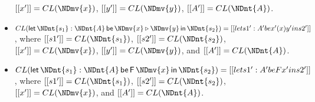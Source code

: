 \begin{definition}
\begin{itemize}
        $[[x']] = CL(\NDmv{x})$, $[[y']] = CL(\NDmv{y})$, $[[A']] = CL(\NDnt{A})$.
  \item $CL( \mathsf{let}\, \NDnt{s_{{\mathrm{1}}}}  :  \NDnt{A} \,\mathsf{be}\, \NDmv{x}  \triangleright  \NDmv{y} \,\mathsf{in}\, \NDnt{s_{{\mathrm{2}}}} ) = [[let s1' : A' be x' (x) y' in s2']]$,
        where $[[s1']] = CL(\NDnt{s_{{\mathrm{1}}}})$, $[[s2']] = CL(\NDnt{s_{{\mathrm{2}}}})$,
        $[[x']] = CL(\NDmv{x})$, $[[y']] = CL(\NDmv{y})$, and
        $[[A']] = CL(\NDnt{A})$.
  \item $CL( \mathsf{let}\, \NDnt{s_{{\mathrm{1}}}}  :  \NDnt{A} \,\mathsf{be}\,  \mathsf{F}\, \NDmv{x}  \,\mathsf{in}\, \NDnt{s_{{\mathrm{2}}}} ) = [[let s1' : A' be F x' in s2']]$,
        where $[[s1']] = CL(\NDnt{s_{{\mathrm{1}}}})$, $[[s2']] = CL(\NDnt{s_{{\mathrm{2}}}})$,
        $[[x']] = CL(\NDmv{x})$, and $[[A']] = CL(\NDnt{A})$.
  \end{itemize}
\end{definition}


